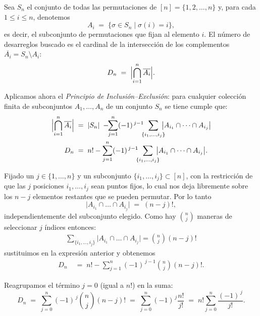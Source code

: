 \begin{solucion}
Sea $S_n$ el conjunto de todas las permutaciones de $[n]=\{1,2,\dots,n\}$ y, para cada
$1\le i\le n$, denotemos  
\[
A_i \;=\;\bigl\{\sigma\in S_n \mid \sigma(i)=i\bigr\},
\]
es decir, el subconjunto de permutaciones que fijan al elemento $i$.  
El número de desarreglos buscado es el cardinal de la intersección de los
complementos $\overline{A_i}=S_n\setminus A_i$:
\[
D_n \;=\;\Bigl|\bigcap_{i=1}^{n}\overline{A_i}\Bigr|.
\]

Aplicamos ahora el \emph{Principio de Inclusión–Exclusión}: para cualquier colección
finita de subconjuntos $A_1,\dots,A_n$ de un conjunto $S_n$ se tiene cumple que:
\begin{align*}
    \Bigl|\bigcap_{i=1}^{n}\overline{A_i}\Bigr|
\;&=\;
|S_n|\;-\!\!\sum_{j=1}^{n}(-1)^{\,j-1}
\!\!\!\sum_{\{i_1,\dots,i_j\}}\!\!\!
\bigl|A_{i_1}\cap\dots\cap A_{i_j}\bigr|\\
D_n \;&=\; n!
-\sum_{j=1}^{n}(-1)^{\,j-1}
\!\!\!\sum_{\{i_1,\dots,i_j\}}\!\!\!
\bigl|A_{i_1}\cap\dots\cap A_{i_j}\bigr|.
\end{align*}


Fijado un $j\in\{1,\dots,n\}$ y un subconjunto $\{i_1,\dots,i_j\}\subset[n]$, con la restricción de que
las $j$ posiciones $i_1,\dots,i_j$ sean puntos fijos, lo cual nos deja 
libremente sobre los $n-j$ elementos restantes que se pueden permutar. Por lo tanto  
\[
\bigl|A_{i_1}\cap\dots\cap A_{i_j}\bigr|\;=\;(n-j)!,
\]
independientemente del subconjunto elegido. Como hay $\binom{n}{j}$ maneras de
seleccionar $j$ índices entonces:
\begin{align*}
    \sum_{\{i_1,\dots,i_j\}}\bigl|A_{i_1}\cap\dots\cap A_{i_j}\bigr| = \binom{n}{j}(n-j)!
\end{align*}
sustituimos en la expresión anterior y obtenemos
\begin{align*}
D_n\;&=\; n!-\sum_{j=1}^{n}(-1)^{\,j-1}\binom{n}{j}(n-j)!.
\end{align*}


Reagrupamos el término $j=0$ (igual a $n!$) en la suma:
\[
D_n \;=\;\sum_{j=0}^{n}(-1)^{\,j}\binom{n}{j}(n-j)!
\;=\;\sum_{j=0}^{n}(-1)^{\,j}\frac{n!}{j!}
\;=\; n!\sum_{j=0}^{n}\frac{(-1)^{\,j}}{j!}.
\]
\end{solucion}